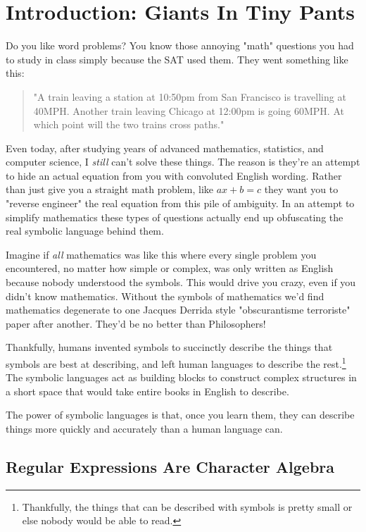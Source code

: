 \chapter*{Introduction: Giants In Tiny Pants}

Do you like word problems? You know those annoying "math" questions you had to 
study in class simply because the SAT used them.  They went something like this:

\begin{quote}
"A train leaving a station at 10:50pm from San Francisco is travelling at
40MPH.  Another train leaving Chicago at 12:00pm is going 60MPH.  At which
point will the two trains cross paths."
\end{quote}

Even today, after studying years of advanced mathematics, statistics, and 
computer science, I \emph{still} can't solve these things.  The reason is
they're an attempt to hide an actual equation from you with convoluted
English wording.  Rather than just give you a straight math problem, like
$ax + b = c$ they want you to "reverse engineer" the real equation from
this pile of ambiguity.  In an attempt to simplify mathematics these 
types of questions actually end up obfuscating the real symbolic language
behind them.

Imagine if \emph{all} mathematics was like this where every single problem you
encountered, no matter how simple or complex, was only written as English
because nobody understood the symbols.  This would drive you crazy, even if you
didn't know mathematics.  Without the symbols of mathematics we'd find
mathematics degenerate to one Jacques Derrida style "obscurantisme terroriste"
paper after another.  They'd be no better than Philosophers!

Thankfully, humans invented symbols to succinctly describe the things that
symbols are best at describing, and left human languages to describe the
rest.\footnote{Thankfully, the things that can be described with symbols is pretty
small or else nobody would be able to read.}  The symbolic languages act as
building blocks to construct complex structures in a short space that would
take entire books in English to describe.

The power of symbolic languages is that, once you learn them, they can
describe things more quickly and accurately than a human language can.

\section{Regular Expressions Are Character Algebra}

